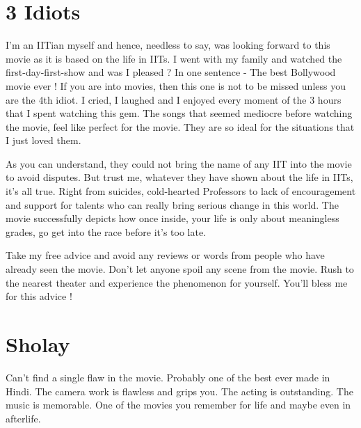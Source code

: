 \documentclass{article}
\begin{document}
\section{3 Idiots}
	
I'm an IITian myself and hence, needless to say, was looking forward to this movie as it is based on the life in IITs. I went with my family and watched the first-day-first-show and was I pleased ? In one sentence - The best Bollywood movie ever ! If you are into movies, then this one is not to be missed unless you are the 4th idiot. I cried, I laughed and I enjoyed every moment of the 3 hours that I spent watching this gem. The songs that seemed mediocre before watching the movie, feel like perfect for the movie. They are so ideal for the situations that I just loved them.

As you can understand, they could not bring the name of any IIT into the movie to avoid disputes. But trust me, whatever they have shown about the life in IITs, it's all true. Right from suicides, cold-hearted Professors to lack of encouragement and support for talents who can really bring serious change in this world. The movie successfully depicts how once inside, your life is only about meaningless grades, go get into the race before it's too late.

Take my free advice and avoid any reviews or words from people who have already seen the movie. Don't let anyone spoil any scene from the movie. Rush to the nearest theater and experience the phenomenon for yourself. You'll bless me for this advice !

\section{Sholay}
	

Can't find a single flaw in the movie. Probably one of the best ever made in Hindi. The camera work is flawless and grips you. The acting is outstanding. The music is memorable. One of the movies you remember for life and maybe even in afterlife.
\end{document}
